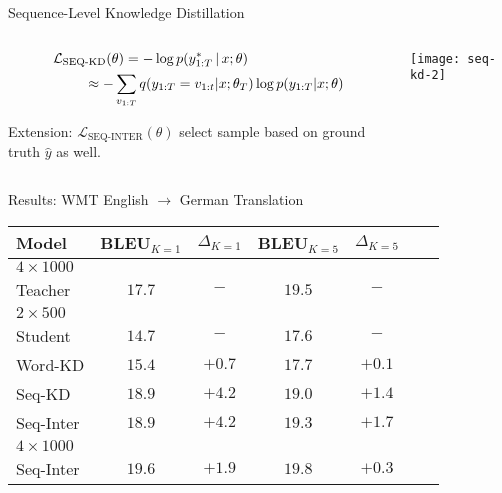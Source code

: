 \begin{frame}{Sequence-Level Knowledge Distillation}

\begin{columns}
\begin{column}{7cm}
\begin{align*}
\mathcal{L}_\text{SEQ-KD}(\theta) &= -\log p(y^*_{1:T} \given x ; \theta)  \\
& \hspace*{-1cm} \displaystyle \approx   -\sum_{v_{1:T}} q(y_{1:T}=v_{1:t}|x; \theta_T) \log p(y_{1:T} | x ; \theta)
\end{align*}
\air

Extension: $\mathcal{L}_\text{SEQ-INTER}(\theta)$ select sample based on ground truth $\hat{y}$
as well.
\end{column}
\begin{column}{7cm}
\texttt{[image: seq-kd-2]}
\end{column}
\end{columns}
\end{frame}

\begin{frame}{Results: WMT English $\rightarrow$ German Translation}
\air
\air
\begin{table}
\centering
\begin{tabular}{lccccrr}
\toprule
Model &    BLEU$_{K=1}$   & $\Delta_{K=1}$ & BLEU$_{K=5}$ & $\Delta_{K=5}$ \\%
\midrule
$4 \times 1000$ \\
Teacher    & $17.7$ &  $-$ & $19.5$&   $-$ \\%
\midrule
\pause
$2 \times 500$ \\
Student  $\,$   & $14.7$ & $-$ & $17.6$&  $-$ \\%
\hspace{1mm} Word-KD  & $15.4$ & $+0.7$& $17.7$& $+0.1$\\%
\pause
\hspace{1mm} Seq-KD   & $18.9$ & $+\mathbf{4.2}$& $19.0$& $+1.4$\\%
\hspace{1mm} Seq-Inter  & $18.9$ & $+\mathbf{4.2}$&$19.3$ & $+\mathbf{1.7}$ \\ %
\midrule
\pause
$4 \times 1000$ \\
\hspace{1mm} Seq-Inter    & $19.6$ & $+1.9$&  $19.8$& $+0.3$\\ %
\bottomrule
\end{tabular}

\end{table}
\air
\air
\end{frame}

